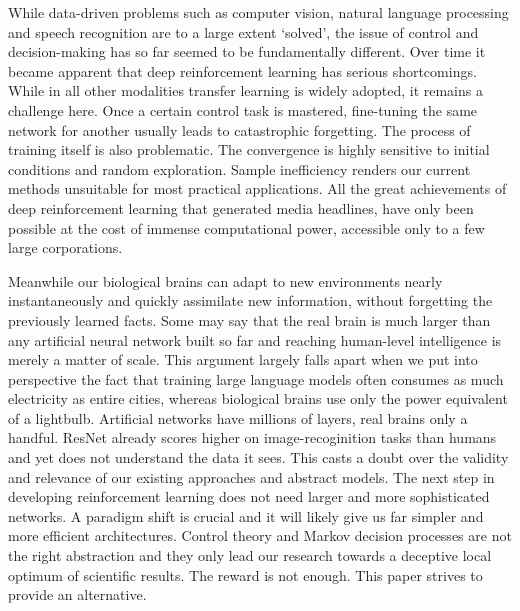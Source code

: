 \documentclass[12pt]{article}
\begin{document}
While data-driven problems such as computer vision, natural language processing and speech recognition are to a large extent `solved', the issue of control and decision-making has so far seemed to be fundamentally different. Over time it became apparent that deep reinforcement learning has serious shortcomings. While in all other modalities transfer learning is widely adopted, it remains a challenge here. Once a certain control task is mastered, fine-tuning the same network for another usually leads to catastrophic forgetting. The process of training itself is also problematic. The convergence is highly sensitive to initial conditions and random exploration. Sample inefficiency renders our current methods unsuitable for most practical applications. All the great achievements of deep reinforcement learning that generated media headlines, have only been possible at the cost of immense computational power, accessible only to a few large corporations. 

Meanwhile our biological brains can adapt to new environments nearly instantaneously and quickly assimilate new information, without forgetting the previously learned facts. Some may say that the real brain is much larger than any artificial neural network built so far and reaching human-level intelligence is merely a matter of scale. This argument largely falls apart when we put into perspective the fact that training large language models often consumes as much electricity as entire cities, whereas biological brains use only the power equivalent of a lightbulb. Artificial networks have millions of layers, real brains only a handful.
ResNet already scores higher on image-recoginition tasks than humans and yet does not understand the data it sees. This casts a doubt over the validity and relevance of our existing approaches and abstract models. The next step in developing reinforcement learning  does not need larger and more sophisticated networks. A paradigm shift is crucial and it will likely give us far simpler and more efficient architectures. Control theory and Markov decision processes are not the right abstraction and they only lead our research towards a deceptive local optimum of scientific results. The reward is not enough. This paper strives to provide an alternative.
\end{document}
